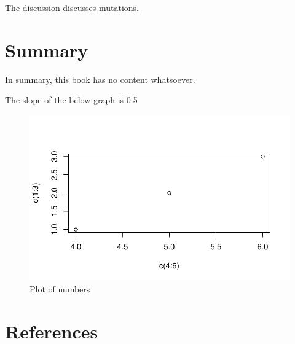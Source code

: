 \documentclass[
  12pt,
  letterpaper,
  DIV=11,
  numbers=noendperiod]{scrreprt}
\begin{document}
The discussion discusses mutations.


\hypertarget{summary}{%
\chapter{Summary}\label{summary}}

In summary, this book has no content whatsoever.

The slope of the below graph is 0.5

\begin{figure}

{\centering \includegraphics{summary_files/figure-pdf/fig-plot-1.pdf}

}

\caption{\label{fig-plot}Plot of numbers}

\end{figure}


\hypertarget{references}{%
\chapter*{References}\label{references}}

\end{document}
